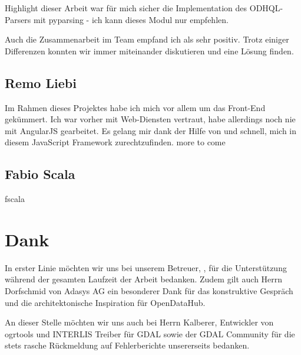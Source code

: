 Highlight dieser Arbeit war für mich sicher die Implementation des ODHQL-Parsers mit pyparsing - ich kann dieses Modul nur empfehlen. 

Auch die Zusammenarbeit im Team empfand ich als sehr positiv. Trotz einiger Differenzen konnten wir immer miteinander diskutieren und eine Lösung finden. 

\subsection{Remo Liebi}
Im Rahmen dieses Projektes habe ich mich vor allem um das Front-End gekümmert. Ich war vorher mit Web-Diensten vertraut, habe allerdings noch nie mit AngularJS gearbeitet. Es gelang mir dank der Hilfe von \fscf und \chuf schnell, mich in diesem JavaScript Framework zurechtzufinden.
\xxx more to come

\subsection{Fabio Scala}
\xxx fscala


\section{Dank}
In erster Linie möchten wir uns bei unserem Betreuer, \proff, für die Unterstützung während der gesamten Laufzeit der Arbeit bedanken. Zudem gilt auch Herrn Dorfschmid von Adasys AG ein besonderer Dank für das konstruktive Gespräch und die architektonische Inspiration für OpenDataHub. 

An dieser Stelle möchten wir uns auch bei Herrn Kalberer, Entwickler von ogrtools und INTERLIS Treiber für GDAL sowie der GDAL Community für die stets rasche Rückmeldung auf Fehlerberichte unsererseits bedanken.
